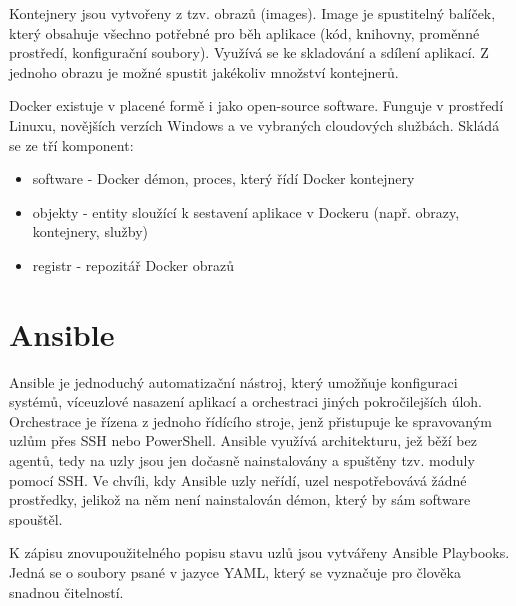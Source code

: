 Kontejnery jsou vytvořeny z tzv. obrazů (images). Image je spustitelný
balíček, který obsahuje všechno potřebné pro běh aplikace (kód,
knihovny, proměnné prostředí, konfigurační soubory). Využívá se ke
skladování a sdílení aplikací. Z jednoho obrazu je možné spustit
jakékoliv množství kontejnerů.

Docker existuje v placené formě i jako open-source software. Funguje v
prostředí Linuxu, novějších verzích Windows a ve vybraných cloudových
službách. Skládá se ze tří komponent:

\begin{itemize}
\item software - Docker démon, proces, který řídí Docker kontejnery
\item objekty - entity sloužící k sestavení aplikace v Dockeru (např. obrazy, kontejnery, služby)
\item registr - repozitář Docker obrazů
\end{itemize}

\section{Ansible}
\label{ansible}  

Ansible je jednoduchý automatizační nástroj, který umožňuje
konfiguraci systémů, víceuzlové nasazení aplikací a orchestraci jiných
pokročilejších úloh. Orchestrace je řízena z jednoho řídícího stroje,
jenž přistupuje ke spravovaným uzlům přes SSH nebo PowerShell. Ansible
využívá architekturu, jež běží bez agentů, tedy na uzly jsou jen
dočasně nainstalovány a spuštěny tzv. moduly pomocí SSH. Ve chvíli,
kdy Ansible uzly neřídí, uzel nespotřebovává žádné prostředky, jelikož
na něm není nainstalován démon, který by sám software spouštěl.

K zápisu znovupoužitelného popisu stavu uzlů jsou vytvářeny Ansible
Playbooks. Jedná se o soubory psané v jazyce YAML, který se vyznačuje
pro člověka snadnou čitelností.
